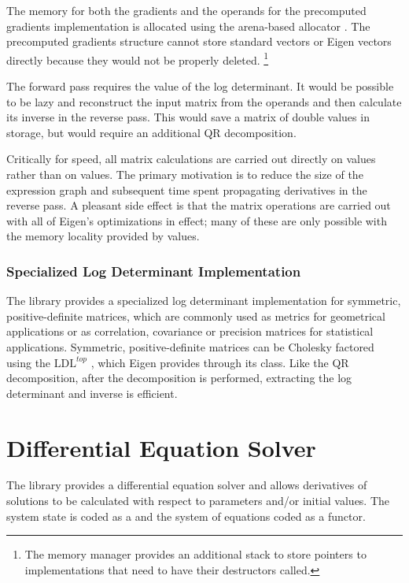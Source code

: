 \documentclass[10pt]{article}
\begin{document}
The memory for both the gradients and the operands for the precomputed
gradients implementation is allocated using the arena-based allocator
.  The precomputed gradients structure cannot store
standard vectors or Eigen vectors directly because they would not be
properly deleted.%
%
\footnote{The  memory manager provides an additional
  stack to store pointers to  implementations that
  need to have their destructors called.}

The forward pass requires the value of the log determinant.  It would
be possible to be lazy and reconstruct the input matrix from the
operands and then calculate its inverse in the reverse pass.  This
would save a matrix of double values in storage, but would require an
additional QR decomposition.

Critically for speed, all matrix calculations are carried out directly
on  values rather than on  values.  The primary
motivation is to reduce the size of the expression graph and
subsequent time spent propagating derivatives in the reverse pass.  A
pleasant side effect is that the matrix operations are carried out
with all of Eigen's optimizations in effect; many of these are only
possible with the memory locality provided by  values.


\subsubsection{Specialized Log Determinant Implementation}

The  library provides a specialized log determinant
implementation for symmetric, positive-definite matrices, which are
commonly used as metrics for geometrical applications or as
correlation, covariance or precision matrices for statistical
applications.  Symmetric, positive-definite matrices can be Cholesky factored
using the $\mbox{LDL}^{top}$ 
\citep[Chapter~4]{GolubVanLoan:96}, which Eigen provides through its
 class.  Like the QR decomposition, after the decomposition
is performed, extracting the log determinant and inverse is efficient.



\section{Differential Equation Solver}

The  library provides a differential equation solver
and allows derivatives of solutions to be calculated with respect to
parameters and/or initial values.  The system state is coded as a
 and the system of equations coded as a functor.
\end{document}
